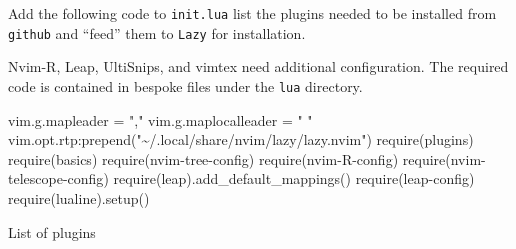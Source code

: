 \documentclass[
  letterpaper,
  DIV=11,
  numbers=noendperiod,
  oneside]{scrartcl}
\newenvironment{Shaded}{\begin{snugshade}}{\end{snugshade}}
\newcommand{\ErrorTok}[1]{\textcolor[rgb]{0.68,0.00,0.00}{#1}}
\newcommand{\ExtensionTok}[1]{\textcolor[rgb]{0.00,0.23,0.31}{#1}}
\newcommand{\FunctionTok}[1]{\textcolor[rgb]{0.28,0.35,0.67}{#1}}
\newcommand{\KeywordTok}[1]{\textcolor[rgb]{0.00,0.23,0.31}{#1}}
\newcommand{\NormalTok}[1]{\textcolor[rgb]{0.00,0.23,0.31}{#1}}
\newcommand{\StringTok}[1]{\textcolor[rgb]{0.13,0.47,0.30}{#1}}
\begin{document}
Add the following code to \texttt{init.lua} list the plugins needed to
be installed from \texttt{github} and ``feed'' them to \texttt{Lazy} for
installation.

Nvim-R, Leap, UltiSnips, and vimtex need additional configuration. The
required code is contained in bespoke files under the \texttt{lua}
directory.

\begin{Shaded}
\begin{Highlighting}[]



\ExtensionTok{vim.g.mapleader}\NormalTok{ = }\StringTok{","}
\ExtensionTok{vim.g.maplocalleader}\NormalTok{ = }\StringTok{" "}
\ExtensionTok{vim.opt.rtp:prepend}\ErrorTok{(}\StringTok{"\textasciitilde{}/.local/share/nvim/lazy/lazy.nvim"}\KeywordTok{)}
\ExtensionTok{require}\ErrorTok{(}\StringTok{\textquotesingle{}plugins\textquotesingle{}}\KeywordTok{)}
\ExtensionTok{require}\ErrorTok{(}\StringTok{\textquotesingle{}basics\textquotesingle{}}\KeywordTok{)}
\ExtensionTok{require}\ErrorTok{(}\StringTok{\textquotesingle{}nvim{-}tree{-}config\textquotesingle{}}\KeywordTok{)}
\ExtensionTok{require}\ErrorTok{(}\StringTok{\textquotesingle{}nvim{-}R{-}config\textquotesingle{}}\KeywordTok{)}
\ExtensionTok{require}\ErrorTok{(}\StringTok{\textquotesingle{}nvim{-}telescope{-}config\textquotesingle{}}\KeywordTok{)}
\ExtensionTok{require}\ErrorTok{(}\StringTok{\textquotesingle{}leap\textquotesingle{}}\KeywordTok{)}\FunctionTok{.add\_default\_mappings()}
\ExtensionTok{require}\ErrorTok{(}\StringTok{\textquotesingle{}leap{-}config\textquotesingle{}}\KeywordTok{)}
\ExtensionTok{require}\ErrorTok{(}\StringTok{\textquotesingle{}lualine\textquotesingle{}}\KeywordTok{)}\FunctionTok{.setup()}
\end{Highlighting}
\end{Shaded}

List of plugins
\end{document}
